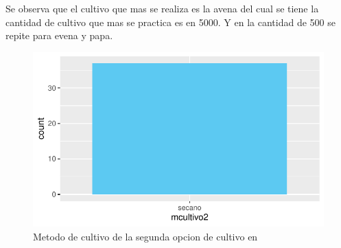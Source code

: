 \documentclass[12pt]{article}\usepackage[]{graphicx}\usepackage[]{xcolor}
\makeatletter
\def\maxwidth{ %
  \ifdim\Gin@nat@width>\linewidth
    \linewidth
  \else
    \Gin@nat@width
  \fi
}
\newenvironment{knitrout}{}{} %
\makeatother
\begin{document}
	Se observa que el cultivo que mas se realiza es la avena del cual se tiene la cantidad de cultivo que mas se practica es en 5000. Y en la cantidad de 500 se repite para evena y papa.
	\begin{figure}[H]
	\centering
\begin{knitrout}
\color{fgcolor}
\includegraphics[width=\maxwidth]{figure/eleven-1} 
\end{knitrout}
	\caption{Metodo de cultivo de la segunda opcion de cultivo en \comunidad}
	\end{figure}
	
\end{document}

